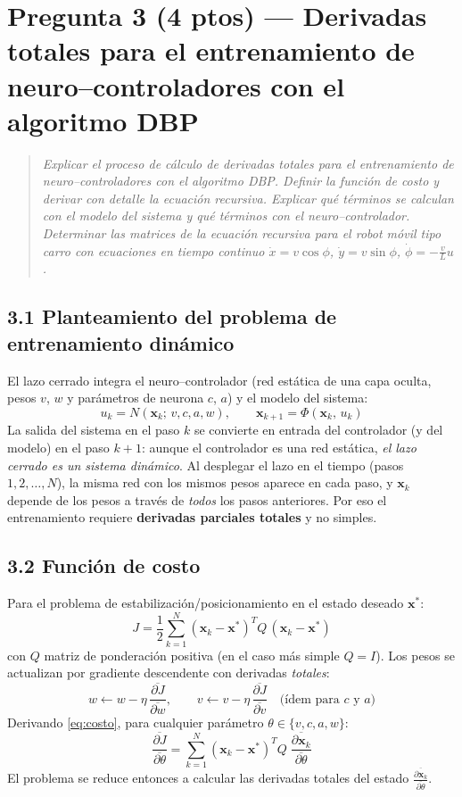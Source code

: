 \documentclass[11pt,a4paper]{article}
\newcommand{\td}[2]{\frac{\overline{\partial #1}}{\overline{\partial #2}}}
\newenvironment{enunciado}
{\begin{quote}\small\itshape\color{azulpucp}}
{\end{quote}}
\begin{document}
\section*{Pregunta 3 (4 ptos) — Derivadas totales para el entrenamiento de neuro--controladores con el algoritmo DBP}

\begin{enunciado}
Explicar el proceso de cálculo de derivadas totales para el entrenamiento de neuro--controladores con el algoritmo DBP. Definir la función de costo y derivar con detalle la ecuación recursiva. Explicar qué términos se calculan con el modelo del sistema y qué términos con el neuro--controlador. Determinar las matrices de la ecuación recursiva para el robot móvil tipo carro con ecuaciones en tiempo continuo $\dot x=v\cos\phi$, $\dot y=v\sin\phi$, $\dot\phi=-\frac{v}{L}u$.
\end{enunciado}

\subsection*{3.1 Planteamiento del problema de entrenamiento dinámico}

El lazo cerrado integra el neuro--controlador (red estática de una capa oculta, pesos $v$, $w$ y parámetros de neurona $c$, $a$) y el modelo del sistema:
\[
u_k=N(\mathbf x_k;\,v,c,a,w),
\qquad
\mathbf x_{k+1}=\Phi(\mathbf x_k,\,u_k)
\]
La salida del sistema en el paso $k$ se convierte en entrada del controlador (y del modelo) en el paso $k+1$: aunque el controlador es una red estática, \emph{el lazo cerrado es un sistema dinámico}. Al desplegar el lazo en el tiempo (pasos $1,2,\dots,N$), la misma red con los mismos pesos aparece en cada paso, y $\mathbf x_k$ depende de los pesos a través de \emph{todos} los pasos anteriores. Por eso el entrenamiento requiere \textbf{derivadas parciales totales} y no simples.

\subsection*{3.2 Función de costo}

Para el problema de estabilización/posicionamiento en el estado deseado $\mathbf x^{*}$:
\begin{equation}
J=\frac{1}{2}\sum_{k=1}^{N}(\mathbf x_k-\mathbf x^{*})^{T}Q\,(\mathbf x_k-\mathbf x^{*})
\label{eq:costo}
\end{equation}
con $Q$ matriz de ponderación positiva (en el caso más simple $Q=I$). Los pesos se actualizan por gradiente descendente con derivadas \emph{totales}:
\[
w \leftarrow w-\eta\,\td{J}{w},
\qquad
v \leftarrow v-\eta\,\td{J}{v}
\quad
\text{(ídem para $c$ y $a$)}
\]
Derivando \eqref{eq:costo}, para cualquier parámetro $\theta\in\{v,c,a,w\}$:
\begin{equation}
\td{J}{\theta}=\sum_{k=1}^{N}(\mathbf x_k-\mathbf x^{*})^{T}Q\;\td{\mathbf x_k}{\theta}
\label{eq:gradJ}
\end{equation}
El problema se reduce entonces a calcular las derivadas totales del estado $\td{\mathbf x_k}{\theta}$.
\end{document}
